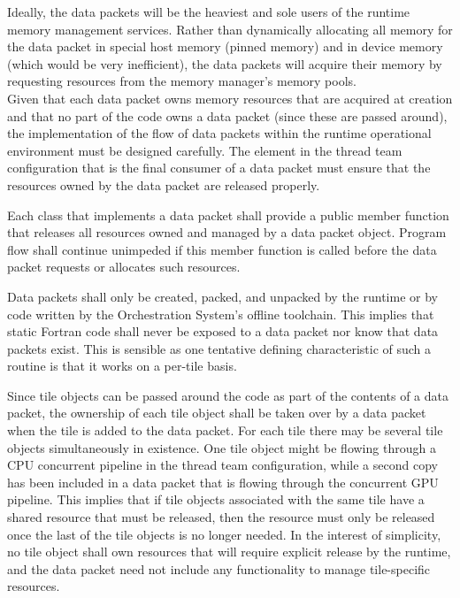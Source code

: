 \documentclass{article}
\begin{document}
Ideally, the data packets will be the heaviest and sole users of the runtime
memory management services.  Rather than dynamically allocating
all memory for the data packet in special host memory (\eg pinned memory) and in
device memory (which would be very inefficient), the data packets will acquire
their memory by requesting resources from the memory manager's memory pools.\\

Given that each data packet owns memory resources that are acquired at creation
and that no part of the code owns a data packet (since these are passed around),
the implementation of the flow of data packets within the runtime operational
environment must be designed carefully. The element in the thread team
configuration that is the final consumer of a data packet must ensure that the
resources owned by the data packet are released properly.

\begin{spec}
Each class that implements a data packet shall provide a public member function
that releases all resources owned and managed by a data packet object.  Program
flow shall continue unimpeded if this member function
is called before the data packet requests or allocates such resources.
\end{spec}

\begin{spec}
Data packets shall only be created, packed, and unpacked by the runtime or by
code written by the Orchestration System's offline toolchain.  This implies that
static Fortran code shall never be exposed to a data packet nor know that data
packets exist.  This is sensible as one tentative defining characteristic of
such a routine is that it works on a per-tile basis.
\end{spec}

\begin{spec}
Since tile objects can be passed around the code as part of the contents of a
data packet, the ownership of each tile object shall be taken over by a data
packet when the tile is added to the data packet.  For each
tile there may be several tile objects simultaneously in existence.  One tile
object might be flowing through a CPU concurrent pipeline in
the thread team configuration, while a second copy has been included in a data
packet that is flowing through the concurrent GPU pipeline.  This implies that
if tile objects associated with the same tile have a shared resource that must
be released, then the resource must only be released once the last of the tile
objects is no longer needed.  In the interest of simplicity, no tile
object shall own resources that will require explicit release by the runtime, and
the data packet need not include any functionality to manage tile-specific
resources.
\end{spec}
\end{document}
